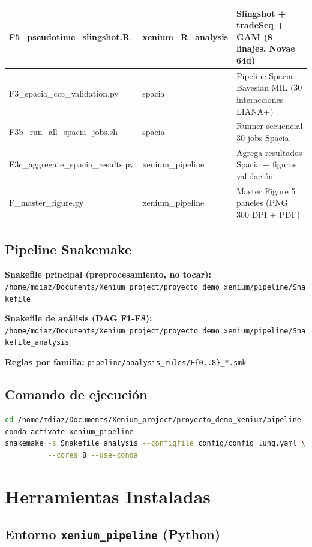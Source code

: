 \documentclass[11pt,a4paper]{article}
\begin{document}
\begin{longtable}{|>{\ttfamily}p{6.5cm}|p{2.5cm}|p{4.5cm}|}
F5\_pseudotime\_slingshot.R & xenium\_R\_analysis & Slingshot + tradeSeq + GAM (8 linajes, Novae 64d) \\
\hline
F3\_spacia\_ccc\_validation.py & spacia & Pipeline Spacia Bayesian MIL (30 interacciones LIANA+) \\
\hline
F3b\_run\_all\_spacia\_jobs.sh & spacia & Runner secuencial 30 jobs Spacia \\
\hline
F3c\_aggregate\_spacia\_results.py & xenium\_pipeline & Agrega resultados Spacia + figuras validación \\
\hline
F\_master\_figure.py & xenium\_pipeline & Master Figure 5 paneles (PNG 300 DPI + PDF) \\
\hline
\end{longtable}

\subsection{Pipeline Snakemake}

\textbf{Snakefile principal (preprocesamiento, no tocar):} \\
\texttt{\small /home/mdiaz/Documents/Xenium\_project/proyecto\_demo\_xenium/pipeline/Snakefile}

\textbf{Snakefile de análisis (DAG F1-F8):} \\
\texttt{\small /home/mdiaz/Documents/Xenium\_project/proyecto\_demo\_xenium/pipeline/Snakefile\_analysis}

\textbf{Reglas por familia:} \texttt{\small pipeline/analysis\_rules/F\{0..8\}\_*.smk}

\subsection{Comando de ejecución}
\begin{lstlisting}[language=bash]
cd /home/mdiaz/Documents/Xenium_project/proyecto_demo_xenium/pipeline
conda activate xenium_pipeline
snakemake -s Snakefile_analysis --configfile config/config_lung.yaml \
          --cores 8 --use-conda
\end{lstlisting}

\newpage
\section{Herramientas Instaladas}

\subsection{Entorno \texttt{xenium\_pipeline} (Python)}
\end{document}
